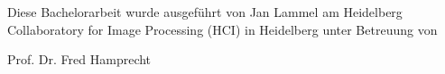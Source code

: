 \begin{titlepage}
    \begin{center}

	

		\vspace{1cm}
        
        \textbf{\myTitle}
        
        \vspace{1cm}


                

        \vfill


           


		\vspace{-3cm}
		Diese Bachelorarbeit wurde ausgeführt von Jan Lammel am  Heidelberg Collaboratory for Image Processing (HCI) in Heidelberg unter Betreuung von
		
		Prof. Dr. Fred Hamprecht               

    \end{center}  
\end{titlepage}   